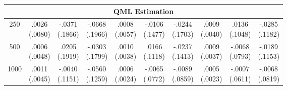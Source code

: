 \documentclass[12pt,a4paper]{article}
\theoremstyle{definition}
\begin{document}
\begin{table}[ht]
\begin{tabular}{c ccc ccc ccc}
\midrule
\multicolumn{10}{c}{\textbf{QML Estimation}}\\
\midrule
250 & \makecell[c]{.0026 \\[-2pt] (.0080)} & \makecell[c]{-.0371 \\[-2pt] (.1866)} & \makecell[c]{-.0668 \\[-2pt] (.1966)} & \makecell[c]{.0008 \\[-2pt] (.0057)} & \makecell[c]{-.0106 \\[-2pt] (.1477)} & \makecell[c]{-.0244 \\[-2pt] (.1703)} & \makecell[c]{.0009 \\[-2pt] (.0040)} & \makecell[c]{.0136 \\[-2pt] (.1048)} & \makecell[c]{-.0285 \\[-2pt] (.1182)} \\
500 & \makecell[c]{.0006 \\[-2pt] (.0048)} & \makecell[c]{.0205 \\[-2pt] (.1919)} & \makecell[c]{-.0303 \\[-2pt] (.1799)} & \makecell[c]{.0010 \\[-2pt] (.0038)} & \makecell[c]{.0166 \\[-2pt] (.1118)} & \makecell[c]{-.0237 \\[-2pt] (.1413)} & \makecell[c]{.0009 \\[-2pt] (.0037)} & \makecell[c]{-.0068 \\[-2pt] (.0793)} & \makecell[c]{-.0189 \\[-2pt] (.1153)} \\
1000 & \makecell[c]{.0011 \\[-2pt] (.0045)} & \makecell[c]{-.0040 \\[-2pt] (.1151)} & \makecell[c]{-.0560 \\[-2pt] (.1259)} & \makecell[c]{.0006 \\[-2pt] (.0024)} & \makecell[c]{-.0065 \\[-2pt] (.0772)} & \makecell[c]{-.0089 \\[-2pt] (.0859)} & \makecell[c]{.0005 \\[-2pt] (.0023)} & \makecell[c]{-.0007 \\[-2pt] (.0611)} & \makecell[c]{-.0068 \\[-2pt] (.0819)} \\
\bottomrule
\end{tabular}
\end{table}
\FloatBarrier
\end{document}
